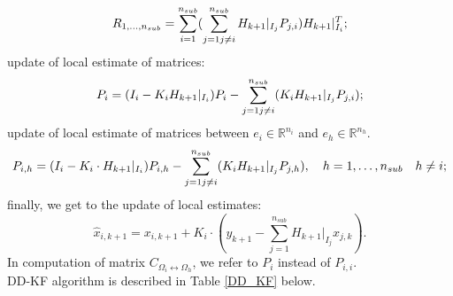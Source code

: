 \documentclass[smallcondensed]{svjour3}
\begin{document}
\begin{equation*}
    R_{1,\ldots,n_{sub}}=\sum_{i=1}^{n_{sub}}(\sum_{j=1\\j\neq i}^{n_{sub}}H_{k+1}|_{I_j}P_{j,i})H_{k+1}|_{I_{i}}^T;
\end{equation*}
update of local estimate of matrices:
\begin{equation*}
    P_{i}=(I_{i}-K_i  H_{k+1}|_{I_i})P_{i}-\sum_{j=1\\ j \neq i}^{n_{sub}}(K_{i}H_{k+1}|_{I_{j}}P_{j,i});
\end{equation*}
 update of local estimate of  matrices between $e_i\in \mathbb{R}^{n_i}$ and $e_h\in \mathbb{R}^{n_h}$.
\begin{equation*}
    P_{i,h}=(I_{i}-K_i\cdot H_{k+1}|_{I_i}) P_{i,h}-\sum_{j=1\\ j\neq i}^{n_{sub}}(K_{i}H_{k+1}|_{I_{j}}P_{j,h}), \quad  h=1,\ldots,n_{sub} \quad h\neq i;
\end{equation*}
finally, we get to  the update of local estimates:
\begin{equation}\label{DD_KF_G_estimates}
    \widehat{x}_{i,k+1}={x}_{i,k+1}+K_{i}\cdot (y_{k+1}-\sum_{j=1 }^{n_{sub}}H_{k+1}|_{I_{j}}x_{j,k}).
\end{equation}
In computation of matrix $C_{\Omega_i \leftrightarrow \Omega_h}$, we refer to $P_{i}$ instead of $P_{i,i}$.\\

\noindent   DD-KF algorithm  is described in Table \ref{DD_KF} below. 
\end{document}
